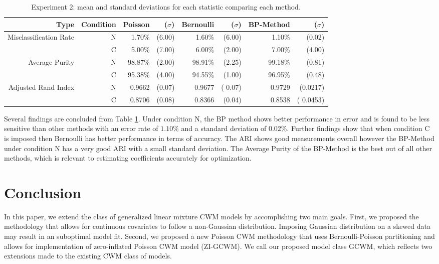 \documentclass[11pt,letterpaper]{article}
\numberwithin{equation}{section}
\numberwithin{equation}{section}
\numberwithin{equation}{section}
\begin{document}
\begin{table}[!htb]
\begin{center}
\caption{Experiment 2: mean and standard deviations for each statistic comparing each method.}
\label{table:exper2}
\begin{tabular}{rrrrrrrr}
\hline\hline
Type   & Condition & Poisson & ($\sigma $) & Bernoulli & ($ \sigma $) & BP-Method & ($ \sigma $) \\
\hline
Misclassification Rate& N         & 1.70\% & (6.00)       & 1.60\%  & (6.00)         & 1.10\% & (0.02)         \\
       & C         & 5.00\% & (7.00)       & 6.00\% & (2.00)         & 7.00\% & (4.00)         \\
Average Purity & N         & 98.87\% & (2.00)    & 98.91\% & (2.25)      & 99.18\% & (0.81)     \\
       & C         & 95.38\% & (4.00)    & 94.55\% & (1.00)      & 96.95\% & (0.48)      \\
Adjusted Rand Index  & N         & 0.9662 & (0.07)    & 0.9677  & ( 0.07)     & 0.9729 & (0.0217)      \\
       & C         & 0.8706 & (0.08)    & 0.8366 & (0.04)      & 0.8538 & ( 0.0453) \\
       \hline\hline
\end{tabular}
\end{center}
\end{table}
Several findings are concluded from Table \ref{table:exper2}. Under condition N, the BP method shows better performance in error and is found to be less sensitive than other methods with an error rate of $ 1.10 \% $ and a standard deviation of $ 0.02 \% $.  Further findings show that when condition C is imposed then Bernoulli has better performance in terms of accuracy. The ARI shows good measurements overall however the BP-Method under condition N has a very good ARI with a small standard deviation. The Average Purity of the BP-Method is the best out of all other methods, which is relevant to estimating coefficients accurately for optimization.

\section{Conclusion}

In this paper, we extend the class of generalized linear mixture CWM models by accomplishing two main goals. First, we proposed the methodology that allows for continuous covariates to follow a non-Gaussian distribution. Imposing Gaussian distribution on a skewed data may result in an suboptimal model fit. Second, we proposed a new Poisson CWM methodology that uses Bernoulli-Poisson partitioning and allows for implementation of zero-inflated Poisson CWM model (ZI-GCWM). We call our proposed model class GCWM, which reflects two extensions made to the existing CWM class of models.
\end{document}

